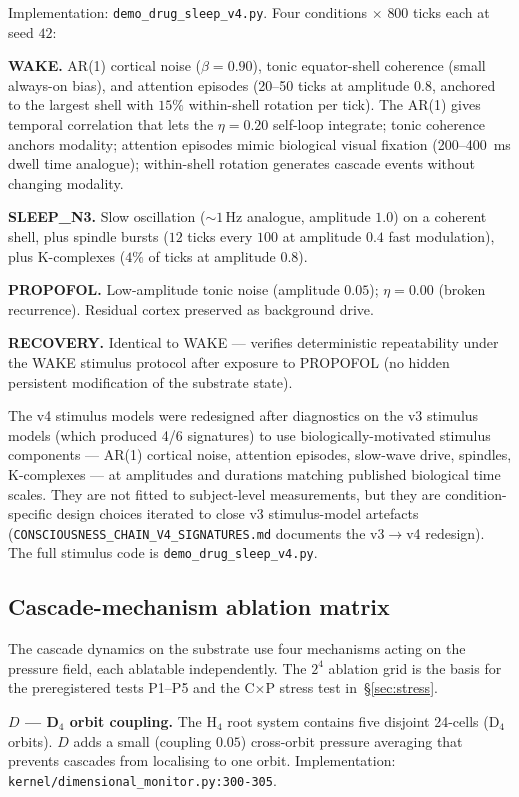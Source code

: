 Implementation: \texttt{demo\_drug\_sleep\_v4.py}. Four conditions
$\times$ $800$ ticks each at seed $42$:

\textbf{WAKE.} AR(1) cortical noise ($\beta=0.90$), tonic equator-shell
coherence (small always-on bias), and attention episodes (20--50
ticks at amplitude $0.8$, anchored to the largest shell with $15\%$
within-shell rotation per tick). The AR(1) gives temporal correlation
that lets the $\eta=0.20$ self-loop integrate; tonic coherence anchors
modality; attention episodes mimic biological visual fixation
(200--400~ms dwell time analogue); within-shell rotation generates
cascade events without changing modality.

\textbf{SLEEP\_N3.} Slow oscillation ($\sim 1$\,Hz analogue,
amplitude $1.0$) on a coherent shell, plus spindle bursts ($12$ ticks
every $100$ at amplitude $0.4$ fast modulation), plus K-complexes
($4\%$ of ticks at amplitude $0.8$).

\textbf{PROPOFOL.} Low-amplitude tonic noise (amplitude $0.05$);
$\eta = 0.00$ (broken recurrence). Residual cortex preserved as
background drive.

\textbf{RECOVERY.} Identical to WAKE — verifies deterministic
repeatability under the WAKE stimulus protocol after exposure to
PROPOFOL (no hidden persistent modification of the substrate state).

The v4 stimulus models were redesigned after diagnostics on the
v3 stimulus models (which produced 4/6 signatures) to use
biologically-motivated stimulus components — AR(1) cortical noise,
attention episodes, slow-wave drive, spindles, K-complexes — at
amplitudes and durations matching published biological time scales.
They are not fitted to subject-level measurements, but they are
condition-specific design choices iterated to close v3 stimulus-model
artefacts (\texttt{CONSCIOUSNESS\_CHAIN\_V4\_SIGNATURES.md} documents
the v3$\to$v4 redesign). The full stimulus code is
\texttt{demo\_drug\_sleep\_v4.py}.

\subsection{Cascade-mechanism ablation matrix}

The cascade dynamics on the substrate use four mechanisms acting on
the pressure field, each ablatable independently. The $2^{4}$
ablation grid is the basis for the preregistered tests P1--P5 and
the C$\times$P stress test in~\S\ref{sec:stress}.

\textbf{$D$ — D$_{4}$ orbit coupling.} The H$_4$ root system contains
five disjoint 24-cells (D$_4$ orbits). $D$ adds a small
(coupling $0.05$) cross-orbit pressure averaging that prevents
cascades from localising to one orbit.
Implementation: \texttt{kernel/dimensional\_monitor.py:300-305}.

